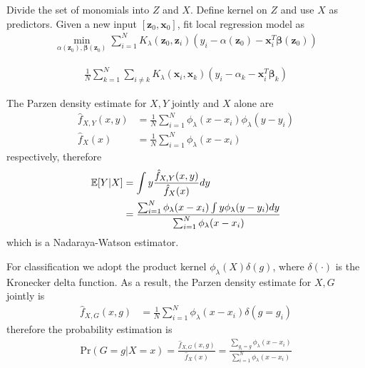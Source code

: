 \begin{exercise}
  Divide the set of monomials into $Z$ and $X$. Define kernel on $Z$ and use
  $X$ as predictors. Given a new input $[\mathbf{z}_0, \mathbf{x}_0]$, fit local
  regression model as
  \begin{align}
    \min_{\alpha(\mathbf{z}_0),
    \bm{\beta}(\mathbf{z}_0)}\sum_{i=1}^NK_{\lambda}(\mathbf{z}_0,\mathbf{z}_i)
    (y_i-\alpha(\mathbf{z}_0) - \mathbf{x}_i^T\bm{\beta}(\mathbf{z}_0) )
  \end{align}
\end{exercise}

\begin{exercise}
  \begin{align}
    \frac{1}{N} \sum_{k=1}^N \sum_{i\not=k}
    K_{\lambda}(\mathbf{x}_i,\mathbf{x}_k) (y_i - \alpha_k -
    \mathbf{x}_i^T\bm{\beta}_k)
  \end{align}
\end{exercise}

\begin{exercise}
  The Parzen density estimate for $X, Y$ jointly and $X$ alone are
  \begin{subequations}
    \begin{align}
      \hat{f}_{X,Y}(x,y) & = \frac{1}{N}\sum_{i=1}^N
      \phi_{\lambda}(x-x_i)\phi_{\lambda}(y-y_i) \\
      \hat{f}_{X}(x) & = \frac{1}{N}\sum_{i=1}^N
      \phi_{\lambda}(x-x_i)
    \end{align}
  \end{subequations}
  respectively, therefore
  \begin{align}
    \mathbb{E}[Y|X] &= \int y \frac{\hat{f}_{X,Y}(x,y)}{\hat{f}_{X}(x)}dy
    \notag\\ &=
    \frac{\sum_{i=1}^N \phi_{\lambda}(x-x_i) \int y\phi_{\lambda}(y-y_i)dy}
    {\sum_{i=1}^N\phi_{\lambda}(x-x_i)}
  \end{align}
  which is a Nadaraya-Watson estimator. 
  
  For classification we adopt the
  product kernel $\phi_{\lambda}(X)\delta(g)$, where $\delta(\cdot)$ is the
  Kronecker delta function. As a result, the Parzen density estimate for $X, G$
  jointly is
  \begin{align}
    \hat{f}_{X,G}(x,g) & = \frac{1}{N}\sum_{i=1}^N
    \phi_{\lambda}(x-x_i)\delta(g=g_i)
  \end{align}
  therefore the probability estimation is
  \begin{align}
    \mbox{Pr}(G=g|X=x) = \frac{\hat{f}_{X,G}(x,g)} {\hat{f}_{X}(x)} =
    \frac{\sum_{g_i=g}\phi_{\lambda}(x-x_i)} {\sum_{i=1}^N\phi_{\lambda}(x-x_i)}
  \end{align}
\end{exercise}

